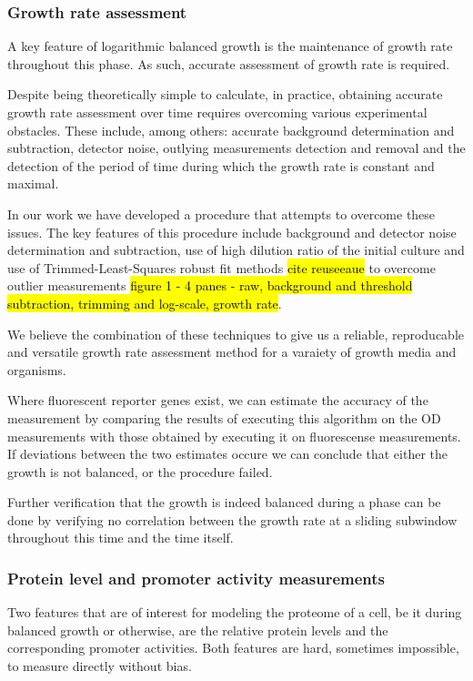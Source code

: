 \documentclass{report}
\begin{document}
\subsubsection{Growth rate assessment}
\label{growth-rate}
A key feature of logarithmic balanced growth is the maintenance of growth rate throughout this phase.
As such, accurate assessment of growth rate is required.

Despite being theoretically simple to calculate, in practice, obtaining accurate growth rate assessment over time requires overcoming various experimental obstacles.
These include, among others: accurate background determination and subtraction, detector noise, outlying measurements detection and removal and the detection of the period of time during which the growth rate is constant and maximal.

In our work we have developed a procedure that attempts to overcome these issues.
The key features of this procedure include background and detector noise determination and subtraction, use of high dilution ratio of the initial culture and use of Trimmed-Least-Squares robust fit methods \hl{cite reuseeaue} to overcome outlier measurements \hl{figure 1 - 4 panes - raw, background and threshold subtraction, trimming and log-scale, growth rate}.

We believe the combination of these techniques to give us a reliable, reproducable and versatile growth rate assessment method for a varaiety of growth media and organisms.

Where fluorescent reporter genes exist, we can estimate the accuracy of the measurement by comparing the results of executing this algorithm on the OD measurements with those obtained by executing it on fluorescense measurements.
If deviations between the two estimates occure we can conclude that either the growth is not balanced, or the procedure failed.

Further verification that the growth is indeed balanced during a phase can be done by verifying no correlation between the growth rate at a sliding subwindow throughout this time and the time itself.
\subsubsection{Protein level and promoter activity measurements}
Two features that are of interest for modeling the proteome of a cell, be it during balanced growth or otherwise, are the relative protein levels and the corresponding promoter activities.
Both features are hard, sometimes impossible, to measure directly without bias.
\end{document}

